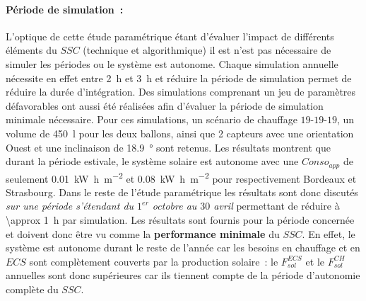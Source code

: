 \paragraph{Période de simulation~:} %
\label{par:periode_de_simulation}
L’optique de cette étude paramétrique étant d’évaluer l’impact de différents éléments du
$SSC$ (technique et algorithmique) il est n’est pas nécessaire de simuler les périodes ou
le système est autonome. Chaque simulation annuelle nécessite en effet entre
\SI{2}{\hour} et \SI{3}{\hour} et réduire la période de simulation permet de réduire la durée
d’intégration. Des simulations comprenant un jeu de paramètres défavorables ont aussi été
réalisées afin d’évaluer la période de simulation minimale nécessaire. Pour ces
simulations, un scénario de chauffage $19$-$19$-$19$, un volume de \SI{450}{\litre} pour les
deux ballons, ainsi que \num{2} capteurs avec une orientation Ouest et une inclinaison de
\SI{18.9}{\degree} sont retenus. Les résultats montrent que durant la
période estivale, le système solaire est autonome avec une $Conso_{app}$ de seulement
\SI[per-mode=symbol]{0.01}{\kilo\watt\hour\per\metre\squared} et
\SI[per-mode=symbol]{0.08}{\kilo\watt\hour\per\metre\squared}
pour respectivement Bordeaux et Strasbourg. Dans le reste de l’étude paramétrique
les résultats sont donc discutés \emph{sur une période s’étendant du $1^{er}$
octobre au $30$ avril} permettant de réduire à \SI{\approx 1}{\hour} par simulation. Les
résultats sont fournis pour la période concernée et doivent donc être vu comme la
\textbf{performance minimale} du $SSC$. En effet, le système est autonome durant le reste
de l’année car les besoins en chauffage et en $ECS$ sont complètement couverts par la
production solaire~: le $F_{sol}^{ECS}$ et le $F_{sol}^{CH}$ annuelles sont donc
supérieures car ils tiennent compte de la période d’autonomie complète du $SSC$.




